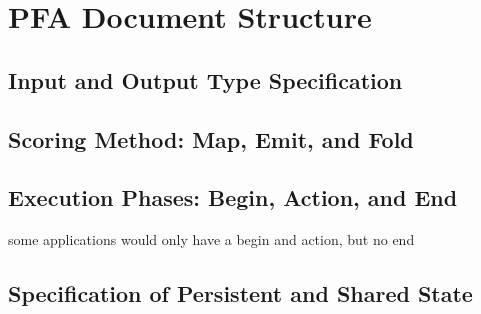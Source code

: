 \documentclass{article}
\begin{document}

\pagebreak

\section{PFA Document Structure}

\subsection{Input and Output Type Specification}

\subsection{Scoring Method: Map, Emit, and Fold}

\subsection{Execution Phases: Begin, Action, and End}

some applications would only have a begin and action, but no end

\subsection{Specification of Persistent and Shared State}
\end{document}
